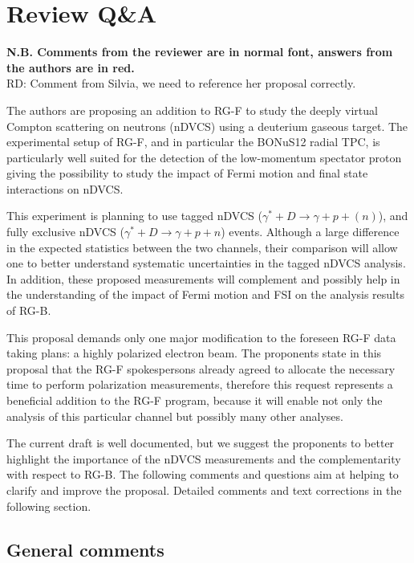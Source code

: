 \chapter{Review Q\&A}
\def \rarr {\ensuremath{\rightarrow}}

{\bf N.B. Comments from the reviewer are in normal font, answers from the authors are in red.} \\

{\color{red} RD: Comment from Silvia, we need to reference her proposal correctly.}
 
 The authors are proposing an addition to RG-F to study the deeply virtual Compton scattering on neutrons (nDVCS) using a deuterium gaseous target. The experimental setup of RG-F, and in particular the BONuS12 radial TPC, is particularly well suited for the detection of the low-momentum spectator proton giving the possibility to study the impact of Fermi motion and final state interactions on nDVCS.
 
 This experiment is planning to use tagged nDVCS ($\gamma^{*} + D \rarr \gamma + p + (n)$), and fully exclusive nDVCS ($\gamma^{*} + D \rarr \gamma + p + n$) events. Although a large difference in the expected statistics between the two channels, their comparison will allow one to better understand systematic uncertainties in the tagged nDVCS analysis. In addition, these proposed measurements will complement and possibly help in the understanding of the impact of Fermi motion and FSI on the analysis results of RG-B.
 
 This proposal demands only one major modification to the foreseen RG-F data taking plans: a highly polarized electron beam. The proponents state in this proposal that the RG-F spokespersons already agreed to allocate the necessary time to perform polarization measurements, therefore this request represents a beneficial addition to the RG-F program, because it will enable not only the analysis of this particular channel but possibly many other analyses.
  
 The current draft is well documented, but we suggest the proponents to better highlight the importance of the nDVCS measurements and the complementarity with respect to RG-B.
 The following comments and questions aim at helping to clarify and improve the proposal. Detailed comments and text corrections in the following section.
 
 
 \section*{General comments}
 
